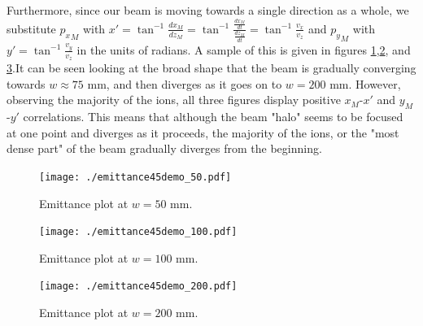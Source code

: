 \documentclass{article}
\begin{document}
Furthermore, since our beam is moving towards a single direction as a whole, we substitute ${p_x}_M$ with $x' = \tan^{-1}{\frac{dx_M}{dz_M}} = \tan^{-1}{\frac{\frac{dx_M}{dt}}{\frac{dz_M}{dt}}} = \tan^{-1}{\frac{v_x}{v_z}}$ and ${p_y}_M$ with $y' = \tan^{-1}{\frac{v_y}{v_z}}$ in the units of radians. A sample of this is given in figures \ref{fig:emittance50},\ref{fig:emittance100}, and \ref{fig:emittance200}.It can be seen looking at the broad shape that the beam is gradually converging towards $w \approx 75$ mm, and then diverges as it goes on to $w = 200$ mm. However, observing the majority of the ions, all three figures display positive $x_M$-$x'$ and $y_M$-$y'$ correlations. This means that although the beam "halo" seems to be focused at one point and diverges as it proceeds, the majority of the ions, or the "most dense part" of the beam gradually diverges from the beginning. 


\begin{figure}[H]
  \begin{center}
    \texttt{[image: ./emittance45demo\_50.pdf]}
    \caption{Emittance plot at $w = 50$ mm.\label{fig:emittance50}}
  \end{center}
\end{figure}

\begin{figure}[H]
  \begin{center}
    \texttt{[image: ./emittance45demo\_100.pdf]}
    \caption{Emittance plot at $w = 100$ mm.\label{fig:emittance100}}
  \end{center}
\end{figure}

\begin{figure}[H]
  \begin{center}
    \texttt{[image: ./emittance45demo\_200.pdf]}
    \caption{Emittance plot at $w = 200$ mm.\label{fig:emittance200}}
  \end{center}
\end{figure}
\end{document}
